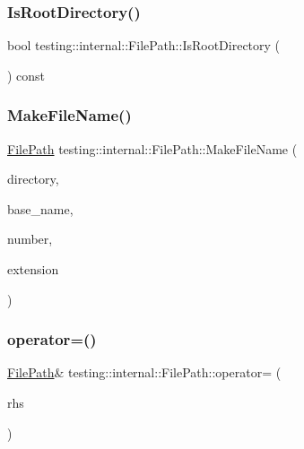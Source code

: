 \subsubsection{\texorpdfstring{Is\+Root\+Directory()}{IsRootDirectory()}}
{\footnotesize\ttfamily bool testing\+::internal\+::\+File\+Path\+::\+Is\+Root\+Directory (\begin{DoxyParamCaption}{ }\end{DoxyParamCaption}) const}

\mbox{\label{classtesting_1_1internal_1_1_file_path_aa8c102da670261eb4fa8e2f2481df139}} 
\subsubsection{\texorpdfstring{Make\+File\+Name()}{MakeFileName()}}
{\footnotesize\ttfamily \hyperlink{classtesting_1_1internal_1_1_file_path}{File\+Path} testing\+::internal\+::\+File\+Path\+::\+Make\+File\+Name (\begin{DoxyParamCaption}\item[{const \hyperlink{classtesting_1_1internal_1_1_file_path}{File\+Path} \&}]{directory,  }\item[{const \hyperlink{classtesting_1_1internal_1_1_file_path}{File\+Path} \&}]{base\+\_\+name,  }\item[{int}]{number,  }\item[{const char $\ast$}]{extension }\end{DoxyParamCaption})\hspace{0.3cm}{\ttfamily [static]}}

\mbox{\label{classtesting_1_1internal_1_1_file_path_a8d9c1bafb90f10bcd5611a54d8f326ef}} 
\subsubsection{\texorpdfstring{operator=()}{operator=()}}
{\footnotesize\ttfamily \hyperlink{classtesting_1_1internal_1_1_file_path}{File\+Path}\& testing\+::internal\+::\+File\+Path\+::operator= (\begin{DoxyParamCaption}\item[{const \hyperlink{classtesting_1_1internal_1_1_file_path}{File\+Path} \&}]{rhs }\end{DoxyParamCaption})\hspace{0.3cm}{\ttfamily [inline]}}

